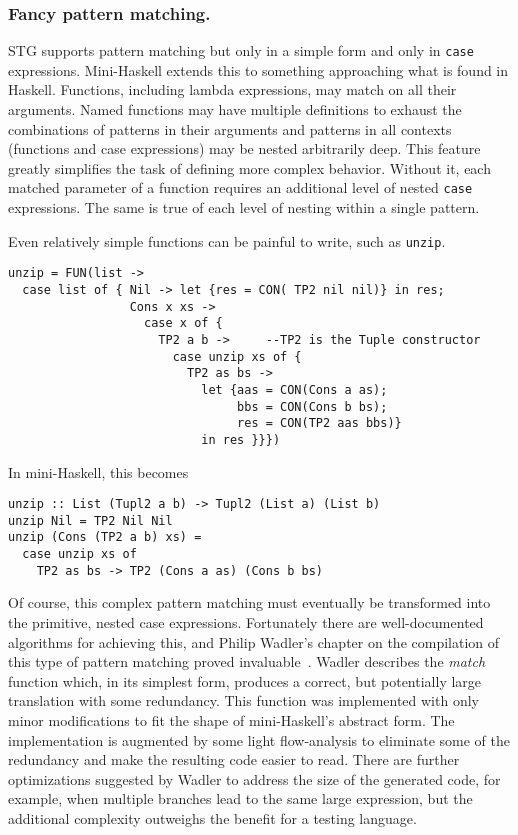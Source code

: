 \documentclass{llncs}
\begin{document}
\subsubsection{Fancy pattern matching.}

STG supports pattern matching but only in a simple form and only in
\texttt{case} expressions.  Mini-Haskell extends this to something approaching
what is found in Haskell.  Functions, including lambda expressions, may match on
all their arguments. Named functions may have multiple definitions to exhaust
the combinations of patterns in their arguments and patterns in all contexts
(functions and case expressions) may be nested arbitrarily deep.  This feature
greatly simplifies the task of defining more complex behavior.  Without it,
each matched parameter of a function requires an additional level of nested
\texttt{case} expressions. The same is true of each level of nesting within a
single pattern.

Even relatively simple functions can be painful to write, such as \texttt{unzip}.
\begin{verbatim}
unzip = FUN(list ->
  case list of { Nil -> let {res = CON( TP2 nil nil)} in res;
                 Cons x xs ->
                   case x of {
                     TP2 a b ->     --TP2 is the Tuple constructor
                       case unzip xs of {
                         TP2 as bs ->
                           let {aas = CON(Cons a as);
                                bbs = CON(Cons b bs);
                                res = CON(TP2 aas bbs)}
                           in res }}})
\end{verbatim}
In mini-Haskell, this becomes
\begin{verbatim}
unzip :: List (Tupl2 a b) -> Tupl2 (List a) (List b)
unzip Nil = TP2 Nil Nil
unzip (Cons (TP2 a b) xs) =
  case unzip xs of
    TP2 as bs -> TP2 (Cons a as) (Cons b bs)
\end{verbatim}

Of course, this complex pattern matching must eventually be transformed into
the primitive, nested case expressions. Fortunately there are well-documented
algorithms for achieving this, and Philip Wadler's chapter
on the compilation of this type of pattern matching proved
invaluable~\cite{Jones:1987}.  Wadler describes the \emph{match} function
which, in its simplest form, produces a correct, but potentially large
translation with some redundancy.  This function was implemented with only
minor modifications to fit the shape of mini-Haskell's abstract form.  The
implementation is augmented by some light flow-analysis to eliminate some of
the redundancy and make the resulting code easier to read.  There are further
optimizations suggested by Wadler to address the size of the generated code,
for example, when multiple branches lead to the same large expression, but the
additional complexity outweighs the benefit for a testing language.
\end{document}
